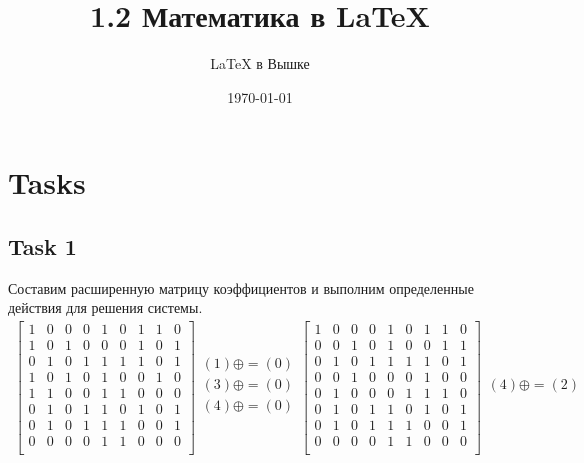 \documentclass[a4paper,10pt]{article} %
\author{\LaTeX{} в Вышке}
\title{1.2 Математика в \LaTeX}
\date{\today}
\begin{document}
	\maketitle
	
	\section{Tasks}
	\subsection{Task 1}
	Составим расширенную матрицу коэффициентов и выполним определенные действия для решения системы.
	\begin{multline}
		\begin{bmatrix}
		1 & 0 & 0 & 0 & 1 & 0 & 1 & 1 & 0 \\
		1 & 0 & 1 & 0 & 0 & 0 & 1 & 0 & 1 \\
		0 & 1 & 0 & 1 & 1 & 1 & 1 & 0 & 1 \\
		1 & 0 & 1 & 0 & 1 & 0 & 0 & 1 & 0 \\
		1 & 1 & 0 & 0 & 1 & 1 & 0 & 0 & 0 \\
		0 & 1 & 0 & 1 & 1 & 0 & 1 & 0 & 1 \\
		0 & 1 & 0 & 1 & 1 & 1 & 0 & 0 & 1 \\
		0 & 0 & 0 & 0 & 1 & 1 & 0 & 0 & 0 \\
		\end{bmatrix}
		\begin{align}
		(1) \oplus= (0)\\
		(3) \oplus= (0)\\
		(4) \oplus= (0)\\
		\end{align}
		\begin{bmatrix}
		1 & 0 & 0 & 0 & 1 & 0 & 1 & 1 & 0 \\
		0 & 0 & 1 & 0 & 1 & 0 & 0 & 1 & 1 \\
		0 & 1 & 0 & 1 & 1 & 1 & 1 & 0 & 1 \\
		0 & 0 & 1 & 0 & 0 & 0 & 1 & 0 & 0 \\
		0 & 1 & 0 & 0 & 0 & 1 & 1 & 1 & 0 \\
		0 & 1 & 0 & 1 & 1 & 0 & 1 & 0 & 1 \\
		0 & 1 & 0 & 1 & 1 & 1 & 0 & 0 & 1 \\
		0 & 0 & 0 & 0 & 1 & 1 & 0 & 0 & 0 \\
		\end{bmatrix}
		\begin{align}
		(4) \oplus= (2)\\

\end{align}
\end{multline}
\end{document}

